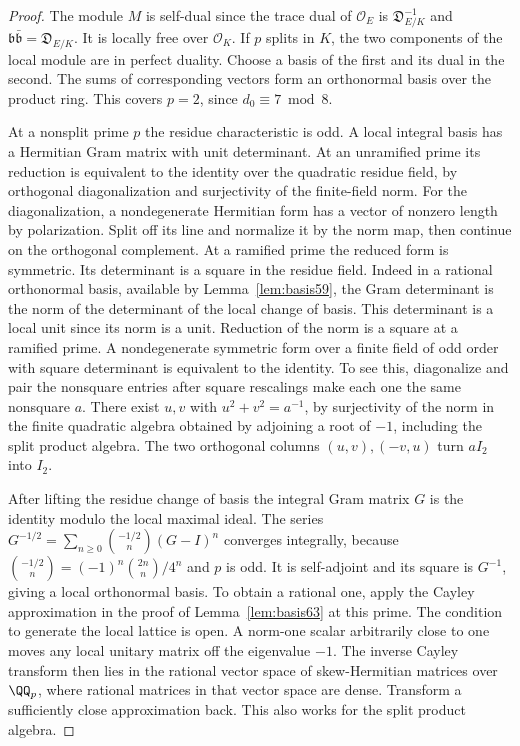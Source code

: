 \documentclass[a4paper,11pt]{article}
\theoremstyle{definition}
\theoremstyle{remark}
\numberwithin{equation}{section}
\newcommand{\OO}{\mathcal O}
\begin{document}
\begin{proof}
The module \(M\) is self-dual since the trace dual of
\(\OO_E\) is \(\mathfrak D_{E/K}^{-1}\) and
\(\mathfrak b\bar{\mathfrak b}=\mathfrak D_{E/K}\). It is
locally free over \(\OO_K\). If \(p\) splits in \(K\), the
two components of the local module are in perfect duality.
Choose a basis of the first and its dual in the second. The
sums of corresponding vectors form an orthonormal basis over
the product ring. This covers \(p=2\), since \(d_0\equiv7\bmod8\).

At a nonsplit prime \(p\) the residue characteristic is odd.
A local integral basis has a Hermitian Gram matrix with unit
determinant. At an unramified prime its reduction is equivalent
to the identity over the quadratic residue field, by orthogonal
diagonalization and surjectivity of the finite-field norm.
For the diagonalization, a nondegenerate Hermitian form has a
vector of nonzero length by polarization. Split off its line
and normalize it by the norm map, then continue on the
orthogonal complement. At a ramified prime the reduced form
is symmetric. Its determinant is a square in the residue field.
Indeed in a rational orthonormal basis, available by
Lemma~\ref{lem:basis59}, the Gram determinant is the norm of
the determinant of the local change of basis. This determinant
is a local unit since its norm is a unit. Reduction of the
norm is a square at a ramified prime. A nondegenerate symmetric
form over a finite field of odd order with square determinant
is equivalent to the identity. To see this, diagonalize and
pair the nonsquare entries after square rescalings make each
one the same nonsquare \(a\). There exist \(u,v\) with
\(u^2+v^2=a^{-1}\), by surjectivity of the norm in the finite
quadratic algebra obtained by adjoining a root of \(-1\),
including the split product algebra. The two orthogonal columns
\((u,v),(-v,u)\) turn \(aI_2\) into \(I_2\).

After lifting the residue change of basis the integral Gram
matrix \(G\) is the identity modulo the local maximal ideal.
The series \(G^{-1/2}=\sum_{n\ge0}\binom{-1/2}{n}(G-I)^n\)
converges integrally, because
\(\binom{-1/2}{n}=(-1)^n\binom{2n}{n}/4^n\) and \(p\) is odd.
It is self-adjoint and its square is \(G^{-1}\), giving a local
orthonormal basis. To obtain a rational one, apply the Cayley
approximation in the proof of Lemma~\ref{lem:basis63} at this
prime. The condition to generate the local lattice is open.
A norm-one scalar arbitrarily close to one moves any local
unitary matrix off the eigenvalue \(-1\). The inverse Cayley
transform then lies in the rational vector space of skew-Hermitian
matrices over \(\QQ_p\), where rational matrices in that vector
space are dense. Transform a sufficiently close approximation
back. This also works for the split product algebra.


\end{proof}
\end{document}

